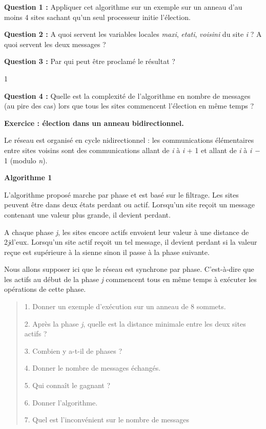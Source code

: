 \documentclass[
]{article}
\begin{document}
\textbf{Question 1 :} Appliquer cet algorithme sur un exemple sur un
anneau d'au moins 4 sites sachant qu'un seul processeur initie
l'élection.

\textbf{Question 2 :} A quoi servent les variables locales \emph{maxi},
\emph{etati}, \emph{voisini} du site \emph{i} ? A quoi servent les deux
messages ?

\textbf{Question 3 :} Par qui peut être proclamé le résultat ?

1

\textbf{Question 4 :} Quelle est la complexité de l'algorithme en nombre
de messages (au pire des cas) lors que tous les sites commencent
l'élection en même temps ?

\textbf{Exercice : élection dans un anneau bidirectionnel.}

Le réseau est organisé en cycle nidirectionnel : les communications
élémentaires entre sites voisins sont des communications allant de
\emph{i} à \emph{i} + 1 et allant de \emph{i} à \emph{i −} 1 (modulo
\emph{n}).

\textbf{Algorithme 1}

L'algorithme proposé marche par phase et est basé sur le ﬁltrage. Les
sites peuvent être dans deux états perdant ou actif. Lorsqu'un site
reçoit un message contenant une valeur plus grande, il devient perdant.

A chaque phase \emph{j}, les sites encore actifs envoient leur valeur à
une distance de 2\emph{j}d'eux. Lorsqu'un site actif reçoit un tel
message, il devient perdant si la valeur reçue est supérieure à la
sienne sinon il passe à la phase suivante.

Nous allons supposer ici que le réseau est synchrone par phase.
C'est-à-dire que les actifs au début de la phase \emph{j} commencent
tous en même temps à exécuter les opérations de cette phase.

\begin{quote}
1. Donner un exemple d'exécution sur un anneau de 8 sommets.

2. Après la phase \emph{j}, quelle est la distance minimale entre les
deux sites actifs ?

3. Combien y a-t-il de phases ?

4. Donner le nombre de messages échangés.

5. Qui connaît le gagnant ?

6. Donner l'algorithme.

7. Quel est l'inconvénient sur le nombre de messages
\end{quote}
\end{document}
